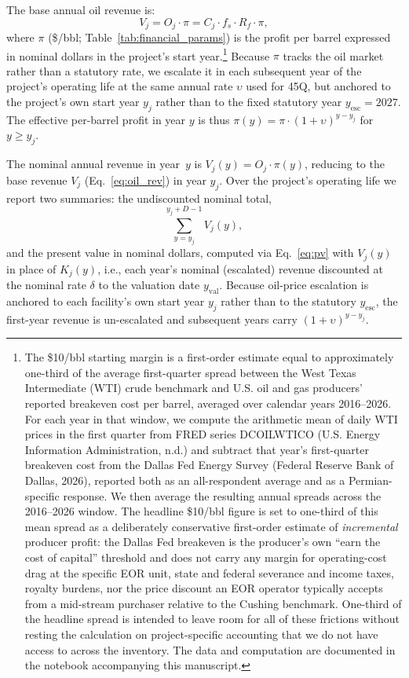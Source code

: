 \documentclass[11pt]{article}
\begin{document}
The base annual oil revenue is:
%
\begin{equation}
  V_j = O_j \cdot \pi = C_j \cdot f_s \cdot R_f \cdot \pi,
  \label{eq:oil_rev}
\end{equation}
%
where $\pi$ (\$/bbl; Table~\ref{tab:financial_params}) is the profit per barrel expressed in nominal dollars in the project's start year.\footnote{The \$10/bbl starting margin is a first-order estimate equal to approximately one-third of the average first-quarter spread between the West Texas Intermediate (WTI) crude benchmark and U.S. oil and gas producers' reported breakeven cost per barrel, averaged over calendar years 2016--2026. For each year in that window, we compute the arithmetic mean of daily WTI prices in the first quarter from FRED series DCOILWTICO (U.S. Energy Information Administration, n.d.) and subtract that year's first-quarter breakeven cost from the Dallas Fed Energy Survey (Federal Reserve Bank of Dallas, 2026), reported both as an all-respondent average and as a Permian-specific response. We then average the resulting annual spreads across the 2016--2026 window. The headline \$10/bbl figure is set to one-third of this mean spread as a deliberately conservative first-order estimate of \emph{incremental} producer profit: the Dallas Fed breakeven is the producer's own ``earn the cost of capital'' threshold and does not carry any margin for operating-cost drag at the specific EOR unit, state and federal severance and income taxes, royalty burdens, nor the price discount an EOR operator typically accepts from a mid-stream purchaser relative to the Cushing benchmark. One-third of the headline spread is intended to leave room for all of these frictions without resting the calculation on project-specific accounting that we do not have access to across the inventory. The data and computation are documented in the notebook accompanying this manuscript.} Because $\pi$ tracks the oil market rather than a statutory rate, we escalate it in each subsequent year of the project's operating life at the same annual rate $\upsilon$ used for 45Q, but anchored to the project's own start year $y_j$ rather than to the fixed statutory year $y_{\text{esc}} = 2027$. The effective per-barrel profit in year $y$ is thus $\pi(y) = \pi \cdot (1 + \upsilon)^{y - y_j}$ for $y \geq y_j$.

The nominal annual revenue in year~$y$ is $V_j(y) = O_j \cdot \pi(y)$, reducing to the base revenue $V_j$ (Eq.~\ref{eq:oil_rev}) in year $y_j$. Over the project's operating life we report two summaries: the undiscounted nominal total,
%
\begin{equation}
  \sum_{y=y_j}^{y_j+D-1} V_j(y),
\end{equation}
%
and the present value in nominal dollars, computed via Eq.~\eqref{eq:pv} with $V_j(y)$ in place of $K_j(y)$, i.e., each year's nominal (escalated) revenue discounted at the nominal rate $\delta$ to the valuation date $y_{\text{val}}$. Because oil-price escalation is anchored to each facility's own start year $y_j$ rather than to the statutory $y_{\text{esc}}$, the first-year revenue is un-escalated and subsequent years carry $(1 + \upsilon)^{y - y_j}$.
\end{document}
